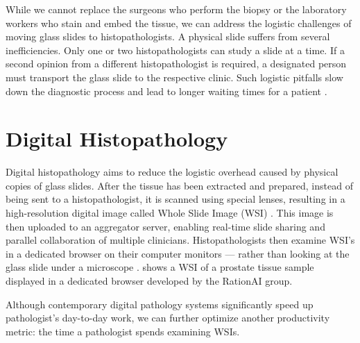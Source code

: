 While we cannot replace the surgeons who perform the biopsy or the laboratory workers who stain and embed the tissue, we can address the logistic challenges of moving glass slides to histopathologists.
A physical slide suffers from several inefficiencies. 
Only one or two histopathologists can study a slide at a time. If a second opinion from a different histopathologist is required, a designated person must transport the glass slide to the respective clinic.
Such logistic pitfalls slow down the diagnostic process and lead to longer waiting times for a patient \cite{from-traditional-to-digital-histopathology}.

\section{Digital Histopathology}

Digital histopathology aims to reduce the logistic overhead caused by physical copies of glass slides.
After the tissue has been extracted and prepared, instead of being sent to a histopathologist, it is scanned using special lenses, resulting in a high-resolution digital image called Whole Slide Image (WSI) \cite{from-traditional-to-digital-histopathology}.
This image is then uploaded to an aggregator server, enabling real-time slide sharing and parallel collaboration of multiple clinicians.
Histopathologists then examine WSI's in a dedicated browser on their computer monitors --- rather than looking at the glass slide under a microscope \cite{digital-histopathology-process}.  shows a WSI of a prostate tissue sample displayed in a dedicated browser developed by the RationAI group.

Although contemporary digital pathology systems significantly speed up pathologist's day-to-day work, we can further optimize another productivity metric: the time a pathologist spends examining WSIs.

